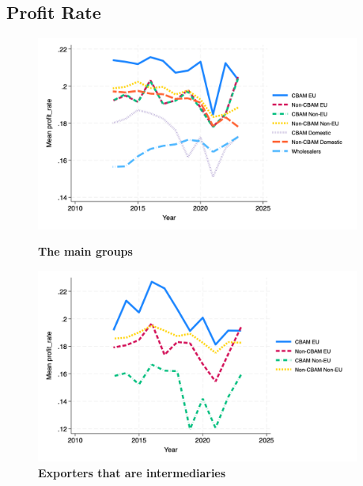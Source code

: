 \documentclass{article}
\begin{document}
\subsection{Profit Rate}
\begin{figure}[H]
\centering
\includegraphics[width=0.95\textwidth]{profit_rate_main_groups.png}
\caption{\textbf{The main groups}}
\includegraphics[width=0.95\textwidth]{profit_rate_ei.png}
\caption{\textbf{Exporters that are intermediaries}}
\end{figure}
\end{document}
